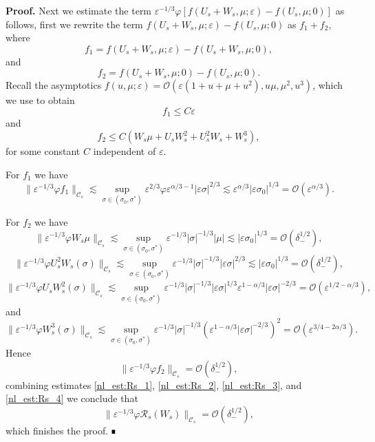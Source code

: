 \documentclass[letterpaper,11pt]{article}
\newcommand{\Ral}{\mathcal{R}}
\newcommand{\rmO}{\mathcal{O}}
\newcommand{\eps}{\varepsilon}
\newcommand{\lar}{ \lesssim }
\numberwithin{equation}{section}
\theoremstyle{plain}
\newenvironment{Proof}[1][.]%
 {\begin{trivlist}\item[]\textbf{Proof#1 }}%
 {\hspace*{\fill}$\rule{0.3\baselineskip}{0.35\baselineskip}$\end{trivlist}}
\begin{document}
\begin{Proof}
Next we estimate the term $\eps^{-1/3}\varphi[ f(U_s+W_s, \mu; \eps)-f(U_s,\mu; 0) ]$ as follows, first we rewrite the term $f(U_s+W_s,\mu;\eps)-f(U_s,\mu;0)$ as $f_1 + f_2$, where
\[
f_1 = f(U_s+W_s,\mu;\eps) - f(U_s+W_s,\mu;0),
\]
and 
\[
f_2 = f(U_s+W_s,\mu;0)  - f(U_s, \mu; 0).
\]
Recall the asymptotics $f(u,\mu ; \eps) = \rmO(\eps(1+u+\mu+u^2), u\mu,\mu^2,u^3)$, which we use to obtain
\[
f_1 \le C\eps
\]
and 
\[
f_2 \le C( W_s\mu + U_sW_s^2+U_s^2W_s+W_s^3),
\]
for some constant $C$ independent of $\eps$.

For $f_1$ we have
\begin{equation}\label{nl_est:Rs_3}
\| \eps^{-1/3}\varphi f_1\|_{\mathcal{C}_s} \lar \sup_{\sigma \in (\sigma_0, \sigma^{*})} \eps^{2/3}\varphi \eps^{\alpha/3-1}|\eps\sigma|^{2/3} \lar \eps^{\alpha/3}|\eps\sigma_0|^{1/3} = \rmO(\eps^{\alpha/3}).
\end{equation}

For $f_2$ we have
\[
\|\eps^{-1/3}\varphi W_s\mu\|_{\mathcal{C}_s} \lar \sup_{\sigma \in (\sigma_0, \sigma^{*})} \eps^{-1/3}|\sigma|^{-1/3}|\mu| \lar |\eps \sigma_0|^{1/3} = \rmO(\delta_-^{1/2}),
\]
\[
\|\eps^{-1/3}\varphi U_s^2W_s(\sigma) \|_{\mathcal{C}_s}  \lar \sup_{\sigma \in (\sigma_0, \sigma^{*})}\eps^{-1/3}|\sigma|^{-1/3} |\eps \sigma|^{2/3} \lar |\eps \sigma_0|^{1/3}= \rmO(\delta_-^{1/2}),
\]
\[
\|\eps^{-1/3}\varphi U_sW_s^2(\sigma) \|_{\mathcal{C}_s}  \lar \sup_{\sigma \in (\sigma_0, \sigma^{*})}\eps^{-1/3}|\sigma|^{-1/3} |\eps \sigma|^{1/3}\eps^{1-\alpha/3}|\eps\sigma|^{-2/3} = \rmO(\eps^{1/2-\alpha/3}),
\]
and
\[
\|\eps^{-1/3}\varphi W_s^3(\sigma) \|_{\mathcal{C}_s}  \lar \sup_{\sigma \in (\sigma_0, \sigma^{*})}\eps^{-1/3}|\sigma|^{-1/3} (\eps^{1-\alpha/3}|\eps\sigma|^{-2/3})^2 = \rmO(\eps^{3/4-2\alpha/3}).
\]
Hence 
\begin{equation}\label{nl_est:Rs_4}
\|\eps^{-1/3}\varphi f_2\|_{\mathcal{C}_s} = \rmO(\delta_-^{1/2}),
\end{equation} 
combining estimates \eqref{nl_est:Rs_1}, \eqref{nl_est:Rs_2}, \eqref{nl_est:Rs_3}, and \eqref{nl_est:Rs_4} we conclude that 
\[
\|\eps^{-1/3}\varphi \Ral_s(W_s) \|_{\mathcal{C}_s} = \rmO(\delta_-^{1/2}),
\]
which finishes the proof.
\end{Proof}
\end{document}
